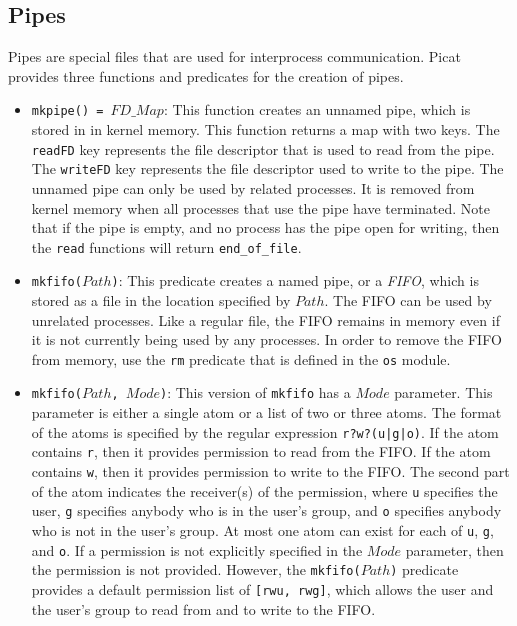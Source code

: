 {\subsection{Pipes}
Pipes are special files that are used for interprocess communication.  Picat provides three functions and predicates for the creation of pipes.
\begin{itemize}
\item \texttt{mkpipe() = $FD\_Map$}:  This function creates an unnamed pipe, which is stored in in kernel memory.  This function returns a map with two keys.  The \texttt{readFD} key represents the file descriptor that is used to read from the pipe.  The \texttt{writeFD} key represents the file descriptor used to write to the pipe.  The unnamed pipe can only be used by related processes.  It is removed from kernel memory when all processes that use the pipe have terminated.  Note that if the pipe is empty, and no process has the pipe open for writing, then the \texttt{read} functions will return \texttt{end\_of\_file}.
\item \texttt{mkfifo($Path$)}:  This predicate creates a named pipe, or a \emph{FIFO}, which is stored as a file in the location specified by $Path$.  The FIFO can be used by unrelated processes.  Like a regular file, the FIFO remains in memory even if it is not currently being used by any processes.  In order to remove the FIFO from memory, use the \texttt{rm} predicate that is defined in the \texttt{os} module.
\item \texttt{mkfifo($Path$, $Mode$)}:  This version of \texttt{mkfifo} has a $Mode$ parameter.  This parameter is either a single atom or a list of two or three atoms.  The format of the atoms is specified by the regular expression \texttt{r?w?(u|g|o)}.  If the atom contains \texttt{r}, then it provides permission to read from the FIFO.  If the atom contains \texttt{w}, then it provides permission to write to the FIFO.  The second part of the atom indicates the receiver(s) of the permission, where \texttt{u} specifies the user, \texttt{g} specifies anybody who is in the user's group, and \texttt{o} specifies anybody who is not in the user's group.  At most one atom can exist for each of \texttt{u}, \texttt{g}, and \texttt{o}.  If a permission is not explicitly specified in the $Mode$ parameter, then the permission is not provided.  However, the \texttt{mkfifo($Path$)} predicate provides a default permission list of \texttt{[rwu, rwg]}, which allows the user and the user's group to read from and to write to the FIFO.
\end{itemize}

}
